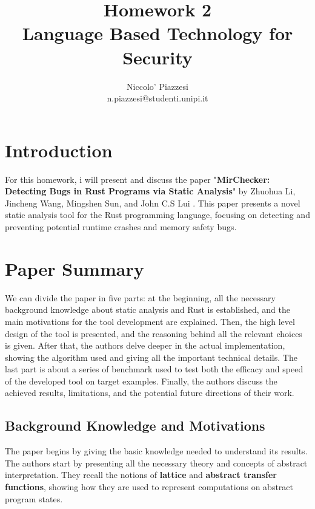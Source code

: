 \documentclass{article}
\title{Homework 2 \\ Language Based Technology for Security}
\author{Niccolo' Piazzesi \\ n.piazzesi@studenti.unipi.it}
\begin{document}
\maketitle
\frenchspacing

\section{Introduction}
For this homework, i will present and discuss the paper "\textbf{MirChecker: Detecting Bugs in Rust Programs via Static Analysis}" by 
Zhuohua Li, Jincheng Wang, Mingshen Sun, and John C.S Lui \cite{li2021mirchecker}. This paper presents a novel static analysis tool for the Rust programming language, 
focusing on detecting and preventing potential runtime crashes and memory safety bugs.
\section{Paper Summary}
We can divide the paper in five parts: at the beginning, all the necessary background knowledge about static analysis and Rust 
is established, and the main motivations for the tool development are explained. Then, the high level design of the tool is presented, and the reasoning behind all the relevant choices is 
given. After that, the authors delve deeper in the actual implementation, showing the algorithm used and giving all the important technical details. The last part is about a series of benchmark used to 
test both the efficacy and speed of the developed tool on target examples. Finally, the authors discuss the achieved results, limitations, and the potential future directions of their work.
\subsection{Background Knowledge and Motivations}
The paper begins by giving the basic knowledge needed to understand its results. The authors start by presenting all the necessary  theory and concepts of abstract interpretation. 
They recall the notions of \textbf{lattice} and \textbf{abstract transfer functions}, showing how they are  used to represent computations on abstract program states. 
\end{document}
